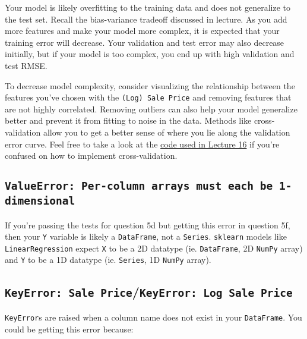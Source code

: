 \documentclass[
  letterpaper,
  DIV=11,
  numbers=noendperiod]{scrreprt}
\begin{document}
Your model is likely overfitting to the training data and does not
generalize to the test set. Recall the bias-variance tradeoff discussed
in lecture. As you add more features and make your model more complex,
it is expected that your training error will decrease. Your validation
and test error may also decrease initially, but if your model is too
complex, you end up with high validation and test RMSE.

To decrease model complexity, consider visualizing the relationship
between the features you've chosen with the \texttt{(Log)\ Sale\ Price}
and removing features that are not highly correlated. Removing outliers
can also help your model generalize better and prevent it from fitting
to noise in the data. Methods like cross-validation allow you to get a
better sense of where you lie along the validation error curve. Feel
free to take a look at the
\href{https://ds100.org/fa24/resources/assets/lectures/lec16/lec16.html}{code
used in Lecture 16} if you're confused on how to implement
cross-validation.

\subsection{\texorpdfstring{\texttt{ValueError:\ Per-column\ arrays\ must\ each\ be\ 1-dimensional}}{ValueError: Per-column arrays must each be 1-dimensional}}\label{valueerror-per-column-arrays-must-each-be-1-dimensional}

If you're passing the tests for question 5d but getting this error in
question 5f, then your \texttt{Y} variable is likely a
\texttt{DataFrame}, not a \texttt{Series}. \texttt{sklearn} models like
\texttt{LinearRegression} expect \texttt{X} to be a 2D datatype (ie.
\texttt{DataFrame}, 2D \texttt{NumPy} array) and \texttt{Y} to be a 1D
datatype (ie. \texttt{Series}, 1D \texttt{NumPy} array).

\subsection{\texorpdfstring{\texttt{KeyError:\ \textquotesingle{}Sale\ Price\textquotesingle{}}/\texttt{KeyError:\ \textquotesingle{}Log\ Sale\ Price\textquotesingle{}}}{KeyError: \textquotesingle Sale Price\textquotesingle/KeyError: \textquotesingle Log Sale Price\textquotesingle{}}}\label{keyerror-sale-pricekeyerror-log-sale-price}

\texttt{KeyError}s are raised when a column name does not exist in your
\texttt{DataFrame}. You could be getting this error because:
\end{document}
